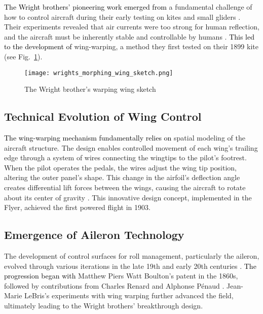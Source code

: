 \documentclass[letterpaper, journal, twoside]{IEEEtran}
\newcommand{\revision}[1]{\textcolor{black}{ #1}}
\begin{document}
\revision{The Wright brothers' pioneering work emerged from} a fundamental challenge of how to control aircraft during their early testing on kites and small gliders \cite{nasm2022researching}. Their experiments revealed that air currents were too strong for human reflection, and the aircraft must be inherently stable and controllable by humans \cite{nasm2022researching}. \revision{This led to the development of} wing-warping, a method they first tested on their 1899 kite (see Fig.~\ref{fig:wrights_morphing_wing_sketch}). 



\begin{figure}[h!]
    \centering
    \texttt{[image: wrights\_morphing\_wing\_sketch.png]}
    \caption{The Wright brother’s warping wing sketch~\cite{biolocomotion2011wright}}
    \label{fig:wrights_morphing_wing_sketch}
\end{figure}


\subsection{Technical Evolution of Wing Control}
\revision{The wing-warping mechanism fundamentally relies on} spatial modeling of the aircraft structure. The design enables controlled movement of each wing's trailing edge through a system of wires connecting the wingtips to the pilot's footrest. When the pilot operates the pedals, the wires adjust the wing tip position, altering the outer panel's shape. This change in the airfoil's deflection angle creates differential lift forces between the wings, causing the aircraft to rotate about its center of gravity \cite{nasa2023warping}. This innovative design concept, implemented in the Flyer, achieved the first powered flight in 1903.

\subsection{Emergence of Aileron Technology}
The development of control surfaces for roll management, particularly the aileron, evolved through various iterations in the late 19th and early 20th centuries \cite{crouch2008oldies}. \revision{The progression began with} Matthew Piers Watt Boulton's patent in the 1860s, followed by contributions from Charles Renard and Alphonse Pénaud \cite{crouch2008oldies}. Jean-Marie LeBris's experiments with wing warping further advanced the field, ultimately leading to the Wright brothers' breakthrough design.
\end{document}
